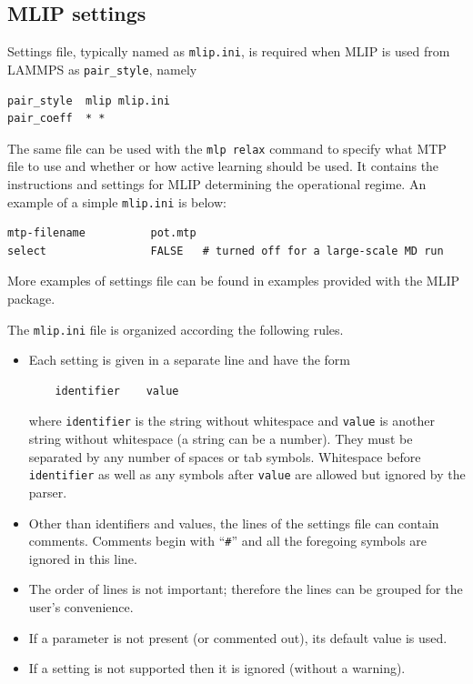 \documentclass[12pt]{article}
\renewcommand{\_}{\char`_}
\begin{document}
\subsection{MLIP settings}\label{sec:mlip:ini}

Settings file, typically named as \verb|mlip.ini|, is required when MLIP is used from LAMMPS as \verb|pair_style|, namely
\begin{verbatim}
pair_style  mlip mlip.ini
pair_coeff  * *
\end{verbatim}
The same file can be used with the \verb|mlp relax| command to specify what MTP file to use and whether or how active learning should be used.
It contains the instructions and settings for MLIP determining the operational regime.
An example of a simple \verb|mlip.ini| is below:
\begin{verbatim}
mtp-filename          pot.mtp
select                FALSE   # turned off for a large-scale MD run
\end{verbatim}
More examples of settings file can be found in examples provided with the MLIP package.

The \verb|mlip.ini| file is organized according the following rules.
\begin{itemize}
	\item Each setting is given in a separate line and have the form 
	\begin{verbatim}
	identifier    value
	\end{verbatim}
	where \texttt{identifier} is the string without whitespace and \texttt{value} is another string without whitespace (a string can be a number). They must be separated by any number of spaces or tab symbols.
	Whitespace before \texttt{identifier} as well as any symbols after \texttt{value} are allowed but ignored by the parser. 
	
	\item Other than identifiers and values, the lines of the settings file can contain comments. Comments begin with ``\texttt{\#}'' and all the foregoing symbols are ignored in this line. 
	
	\item The order of lines is not important; therefore the lines can be grouped for the user's convenience.
	
	\item If a parameter is not present (or commented out), its default value is used. 
	
	\item If a setting is not supported then it is ignored (without a warning).
\end{itemize}
\end{document}
